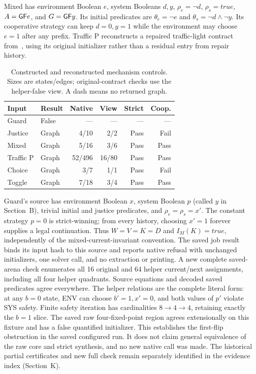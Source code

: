 Mixed has environment Boolean $e$,
system Booleans $d,y$, $\rho_e=\neg d$, $\rho_s=\mathit{true}$,
$A=\mathsf{G}\mathsf{F} e$, and $G=\mathsf{G}\mathsf{F} y$. Its initial predicates are $\theta_e=\neg e$ and $\theta_s=\neg d\land\neg y$. Its cooperative strategy can keep
$d=0,y=1$ while the environment may choose $e=1$ after any prefix.
Traffic P reconstructs a repaired traffic-light contract from~\cite{degradation}, using its original initializer rather than a residual entry from repair history.

\begin{table}[t]
\centering
\caption{Constructed and reconstructed mechanism controls. Sizes are states/edges; original-contract checks use the helper-false view. A dash means no returned graph.}
\label{tab:controls}
\small
\begin{tabular}{@{}llrrrr@{}}
\toprule
Input & Result & Native & View & Strict & Coop.\\
\midrule
Guard & False & --- & --- & --- & ---\\
Justice & Graph & 4/10 & 2/2 & Pass & Fail\\
Mixed & Graph & 5/16 & 3/6 & Pass & Pass\\
Traffic P & Graph & 52/496 & 16/80 & Pass & Pass\\
Choice & Graph & 3/7 & 1/1 & Pass & Fail\\
Toggle & Graph & 7/18 & 3/4 & Pass & Pass\\
\bottomrule
\end{tabular}
\end{table}

Guard's source has environment Boolean $x$, system Boolean $p$
(called $y$ in Section~B), trivial initial and justice predicates,
and $\rho_e=\rho_s=x'$. The constant strategy $p=0$ is strict-winning;
from every history, choosing $x'=1$ forever supplies a legal
continuation. Thus $W=V=K=D$ and $I_M(K)=\mathit{true}$, independently
of the mixed-current-invariant convention.
The saved job result binds its input hash to this source and reports
native refusal with unchanged initializers, one solver call, and no
extraction or printing. A new complete saved-arena check enumerates
all 16 original and 64 helper current/next assignments, including all
four helper quadrants. Source equations and decoded saved predicates
agree everywhere. The helper relations are the complete literal form:
at any $b=0$ state, ENV can choose $b'=1,x'=0$, and both values of $p'$
violate SYS safety. Finite safety iteration has cardinalities
$8\to4\to4$, retaining exactly the $b=1$ slice. The saved raw
four-fixed-point region agrees extensionally on this fixture and has
a false quantified initializer. This establishes the first-flip
obstruction in the saved configured run. It does not claim general
equivalence of the raw core and strict synthesis, and no new native
call was made. The historical partial certificates and new full check
remain separately identified in the evidence index (Section~K).

